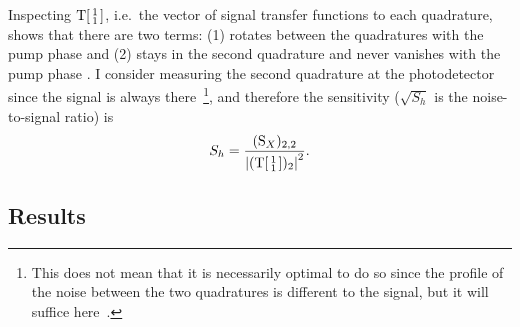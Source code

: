 Inspecting $\text{T}\begin{bsmallmatrix}1 \\1\end{bsmallmatrix}$, i.e.\ the vector of signal transfer functions to each quadrature, shows that there are two terms: (1) rotates between the quadratures with the pump phase and (2) stays in the second quadrature and never vanishes with the pump phase . I consider measuring the second quadrature at the photodetector since the signal is always there~\footnote{This does not mean that it is necessarily optimal to do so since the profile of the noise between the two quadratures is different to the signal, but it will suffice here~\cite{}. }, and therefore the sensitivity ($\sqrt{S_h}$ is the noise-to-signal ratio) is
\begin{equation}
S_h = \frac{(\text{S}_X)_{2,2}}{\abs{(\text{T}\begin{bsmallmatrix}1 \\1\end{bsmallmatrix})_2}^2}.
\end{equation}

\subsection{Results}
\label{sec:dIS_results}

